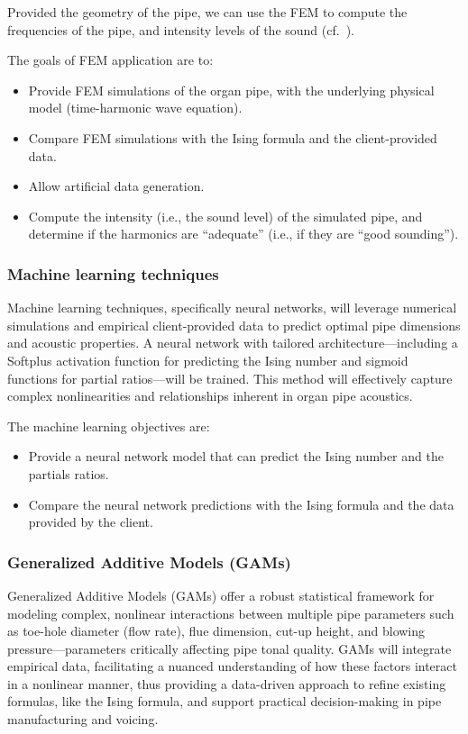 \documentclass{psu-plan}
\begin{document}
Provided the geometry of the pipe, we can use the FEM to compute the frequencies
of the pipe, and intensity levels of the sound
(cf.~\autocite[Figure 1]{2009RucAugFia-1}).

The goals of FEM application are to:
\begin{itemize}
    \item Provide FEM simulations of the organ pipe, with the underlying
        physical model (time-harmonic wave equation).
 \item Compare FEM simulations with the Ising formula and the client-provided data.
 \item Allow artificial data generation.
 \item Compute the intensity (i.e., the sound level) of the simulated pipe,
        and determine if the harmonics are ``adequate'' (i.e., if they are
        ``good sounding'').
\end{itemize}


\subsubsection{Machine learning techniques}

Machine learning techniques, specifically neural networks, will leverage numerical simulations and empirical 
client-provided data to predict optimal pipe dimensions and acoustic properties. 
A neural network with tailored architecture—including a Softplus activation function for predicting the 
Ising number and sigmoid functions for partial ratios—will be trained. 
This method will effectively capture complex nonlinearities and relationships inherent in organ pipe acoustics.

The machine learning objectives are:
\begin{itemize}
    \item Provide a neural network model that can predict the Ising number and
        the partials ratios.
 \item Compare the neural network predictions with the Ising formula and the
        data provided by the client.
\end{itemize}

\subsubsection{Generalized Additive Models (GAMs)}

Generalized Additive Models (GAMs) offer a robust statistical framework for modeling complex, 
nonlinear interactions between multiple pipe parameters such as toe-hole diameter (flow rate), flue dimension,
cut-up height, and blowing pressure—parameters critically affecting pipe tonal quality. 
GAMs will integrate empirical data, facilitating a nuanced understanding of how these factors interact in a nonlinear 
manner, thus providing a data-driven approach to refine existing formulas, like the Ising formula, and support 
practical decision-making in pipe manufacturing and voicing.
\end{document}
